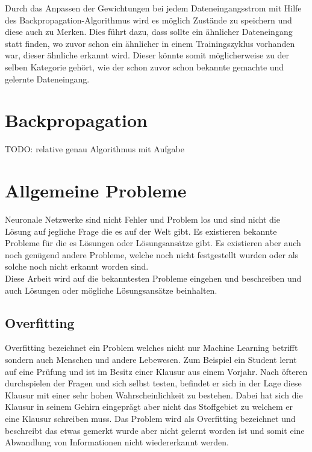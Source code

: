 Durch das Anpassen der Gewichtungen bei jedem Dateneingangsstrom mit Hilfe des Backpropagation-Algorithmus wird es möglich Zustände zu speichern und diese auch zu Merken. 
Dies führt dazu, dass sollte ein ähnlicher Dateneingang statt finden, wo zuvor schon ein ähnlicher in einem Trainingszyklus vorhanden war, dieser ähnliche erkannt wird. 
Dieser könnte somit möglicherweise zu der selben Kategorie gehört, wie der schon zuvor schon bekannte gemachte und gelernte Dateneingang.

\section{Backpropagation}

TODO: relative genau Algorithmus mit Aufgabe

\section{Allgemeine Probleme}

Neuronale Netzwerke sind nicht Fehler und Problem los und sind nicht die Lösung auf jegliche Frage die es auf der Welt gibt. 
Es existieren bekannte Probleme für die es Lösungen oder Lösungsansätze gibt. 
Es existieren aber auch noch genügend andere Probleme, welche noch nicht festgestellt wurden oder als solche noch nicht erkannt worden sind. \\

Diese Arbeit wird auf die bekanntesten Probleme eingehen und beschreiben und auch Lösungen oder mögliche Lösungsansätze beinhalten. 

\subsection{Overfitting}

Overfitting bezeichnet ein Problem welches nicht nur Machine Learning betrifft sondern auch Menschen und andere Lebewesen. 
Zum Beispiel ein Student lernt auf eine Prüfung und ist im Besitz einer Klausur aus einem Vorjahr. 
Nach öfteren durchspielen der Fragen und sich selbst testen, befindet er sich in der Lage diese Klausur mit einer sehr hohen Wahrscheinlichkeit zu bestehen. 
Dabei hat sich die Klausur in seinem Gehirn eingeprägt aber nicht das Stoffgebiet zu welchem er eine Klausur schreiben muss. 
Das Problem wird als Overfitting bezeichnet und beschreibt das etwas gemerkt wurde aber nicht gelernt worden ist und somit eine Abwandlung von Informationen nicht wiedererkannt werden.


